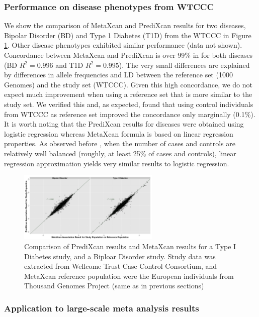 \documentclass[10pt]{article}
\begin{document}
\subsubsection*{Performance on disease phenotypes from WTCCC}

We show the comparison of MetaXcan and PrediXcan results for two diseases, Bipolar Disorder (BD) and Type 1 Diabetes (T1D) from the WTCCC in Figure \ref{fig:BDT1DMP}. Other disease phenotypes exhibited similar performance (data not shown). Concordance between MetaXcan and PrediXcan is over 99\% in for both diseases (BD $R^2=0.996$ and T1D $R^2=0.995$). The very small differences are explained by differences in allele frequencies and LD between the reference set (1000 Genomes) and the study set (WTCCC). Given this high concordance, we do not expect much improvement when using a reference set that is more similar to the study set. We verified this and, as expected, found that using control individuals from WTCCC as reference set improved the concordance only marginally (0.1\%).
It is worth noting that the PrediXcan results for diseases were obtained using logistic regression whereas MetaXcan formula is based on linear regression properties. As observed before \cite{BSLMM, GCTA}, when the number of cases and controls are relatively well balanced (roughly, at least 25\% of cases and controls), linear regression approximation yields very similar results to logistic regression.

\begin{figure}
\includegraphics[width=0.6\textwidth]{plots/Fig5-BDT1D.png}
\caption{Comparison of PrediXcan results and MetaXcan results for a Type I Diabetes study, and a Biploar Disorder study.
Study data was extracted from Wellcome Trust Case Control Consortium,
and MetaXcan reference population were the European individuals from Thousand Genomes Project
(same as in previous sections) }
\label{fig:BDT1DMP}
\end{figure}

\subsubsection*{Application to large-scale meta analysis results}
\end{document}
